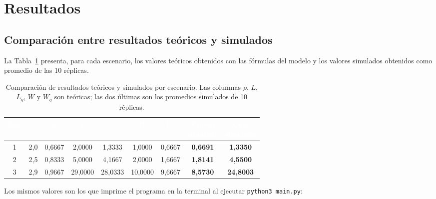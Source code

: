 \documentclass[11pt,a4paper]{article}
\renewcommand{\arraystretch}{1.08}
\begin{document}
\section{Resultados}

\subsection{Comparación entre resultados teóricos y simulados}

La Tabla~\ref{tab:comparacion} presenta, para cada escenario, los valores teóricos
obtenidos con las fórmulas del modelo y los valores simulados obtenidos como promedio
de las 10 réplicas.

\begin{table}[h!]
\centering
\setlength{\arrayrulewidth}{0.75pt}
\renewcommand{\arraystretch}{1.3}
\small
\begin{tabular}{|c|c|c|c|c|c|c|c|c|}
\hline
\rowcolor{headerblue}
\textbf{\textcolor{white}{Esc.}} &
\textbf{\textcolor{white}{$\lambda$}} &
\textbf{\textcolor{white}{$\rho$}} &
\textbf{\textcolor{white}{$L$}} &
\textbf{\textcolor{white}{$L_q$}} &
\textbf{\textcolor{white}{$W$}} &
\textbf{\textcolor{white}{$W_q$}} &
\makecell{\textbf{\textcolor{white}{Espera}} \\ \textbf{\textcolor{white}{simulada}}} &
\makecell{\textbf{\textcolor{white}{Cola}} \\ \textbf{\textcolor{white}{simulada}}} \\ \hline
1 & 2{,}0 & 0{,}6667 & 2{,}0000 & 1{,}3333 & 1{,}0000 & 0{,}6667 & \textbf{0{,}6691} & \textbf{1{,}3350} \\ \hline
\rowcolor{rowlight}
2 & 2{,}5 & 0{,}8333 & 5{,}0000 & 4{,}1667 & 2{,}0000 & 1{,}6667 & \textbf{1{,}8141} & \textbf{4{,}5500} \\ \hline
3 & 2{,}9 & 0{,}9667 & 29{,}0000 & 28{,}0333 & 10{,}0000 & 9{,}6667 & \textbf{8{,}5730} & \textbf{24{,}8003} \\ \hline
\end{tabular}
\caption{Comparación de resultados teóricos y simulados por escenario. Las columnas
$\rho$, $L$, $L_q$, $W$ y $W_q$ son teóricas; las dos últimas son los promedios
simulados de 10 réplicas.}
\label{tab:comparacion}
\end{table}

Los mismos valores son los que imprime el programa en la terminal al ejecutar
\texttt{python3 main.py}:
\end{document}
